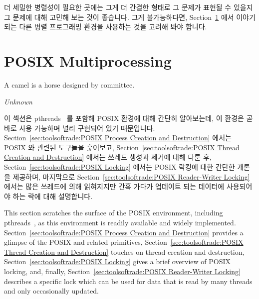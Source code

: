 {	\fi

	더 세밀한 병렬성이 필요한 곳에는 그게 더 간결한 형태로 그 문제가 표현될
	수 있을지 그 문제에 대해 고민해 보는 것이 좋습니다.
	그게 불가능하다면,
	Section~\ref{sec:toolsoftrade:POSIX Multiprocessing}
	에서 이야기 되는 다른 병렬 프로그래밍 환경을 사용하는 것을 고려해 봐야
	합니다.

}\QuickQuizEnd

\section{POSIX Multiprocessing}
\label{sec:toolsoftrade:POSIX Multiprocessing}
%
\epigraph{A camel is a horse designed by committee.}{\emph{Unknown}}

이 섹션은 pthreads~\cite{OpenGroup1997pthreads} 를 포함해 POSIX 환경에 대해
간단히 알아보는데, 이 환경은 곧바로 사용 가능하며 널리 구현되어 있기
때문입니다.
Section~\ref{sec:toolsoftrade:POSIX Process Creation and Destruction}
에서는 POSIX  와 관련된 도구들을 훑어보고,
Section~\ref{sec:toolsoftrade:POSIX Thread Creation and Destruction}
에서는 쓰레드 생성과 제거에 대해 다룬 후,
Section~\ref{sec:toolsoftrade:POSIX Locking}
에서는 POSIX 락킹에 대한 간단한 개론을 제공하며, 마지막으로
Section~\ref{sec:toolsoftrade:POSIX Reader-Writer Locking}
에서는 많은 쓰레드에 의해 읽혀지지만 간혹 가다가 업데이트 되는 데이터에
사용되어야 하는 락에 대해 설명합니다.

\iffalse

This section scratches the surface of the
POSIX environment, including pthreads~\cite{OpenGroup1997pthreads},
as this environment is readily available and widely implemented.
Section~\ref{sec:toolsoftrade:POSIX Process Creation and Destruction}
provides a glimpse of the POSIX  and related primitives,
Section~\ref{sec:toolsoftrade:POSIX Thread Creation and Destruction}
touches on thread creation and destruction,
Section~\ref{sec:toolsoftrade:POSIX Locking} gives a brief overview
of POSIX locking, and, finally,
Section~\ref{sec:toolsoftrade:POSIX Reader-Writer Locking} describes a
specific lock which can be used for data that is read by many threads and only
occasionally updated.

